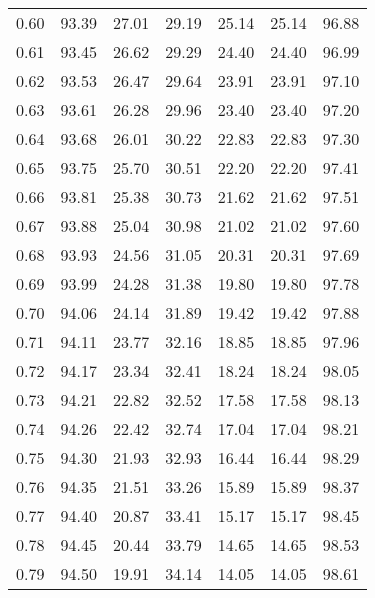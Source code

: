 \begin{tabular}{|c|c|c|c|c|c|c|}
      0.60 &     93.39 &     27.01 &      29.19 &   25.14 &      25.14 &         96.88 \\
      0.61 &     93.45 &     26.62 &      29.29 &   24.40 &      24.40 &         96.99 \\
      0.62 &     93.53 &     26.47 &      29.64 &   23.91 &      23.91 &         97.10 \\
      0.63 &     93.61 &     26.28 &      29.96 &   23.40 &      23.40 &         97.20 \\
      0.64 &     93.68 &     26.01 &      30.22 &   22.83 &      22.83 &         97.30 \\
      0.65 &     93.75 &     25.70 &      30.51 &   22.20 &      22.20 &         97.41 \\
      0.66 &     93.81 &     25.38 &      30.73 &   21.62 &      21.62 &         97.51 \\
      0.67 &     93.88 &     25.04 &      30.98 &   21.02 &      21.02 &         97.60 \\
      0.68 &     93.93 &     24.56 &      31.05 &   20.31 &      20.31 &         97.69 \\
      0.69 &     93.99 &     24.28 &      31.38 &   19.80 &      19.80 &         97.78 \\
      0.70 &     94.06 &     24.14 &      31.89 &   19.42 &      19.42 &         97.88 \\
      0.71 &     94.11 &     23.77 &      32.16 &   18.85 &      18.85 &         97.96 \\
      0.72 &     94.17 &     23.34 &      32.41 &   18.24 &      18.24 &         98.05 \\
      0.73 &     94.21 &     22.82 &      32.52 &   17.58 &      17.58 &         98.13 \\
      0.74 &     94.26 &     22.42 &      32.74 &   17.04 &      17.04 &         98.21 \\
      0.75 &     94.30 &     21.93 &      32.93 &   16.44 &      16.44 &         98.29 \\
      0.76 &     94.35 &     21.51 &      33.26 &   15.89 &      15.89 &         98.37 \\
      0.77 &     94.40 &     20.87 &      33.41 &   15.17 &      15.17 &         98.45 \\
      0.78 &     94.45 &     20.44 &      33.79 &   14.65 &      14.65 &         98.53 \\
      0.79 &     94.50 &     19.91 &      34.14 &   14.05 &      14.05 &         98.61 \\

\end{tabular}
